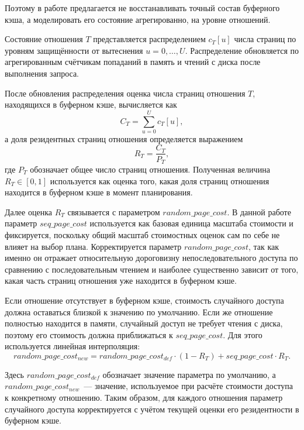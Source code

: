 Поэтому в работе предлагается не восстанавливать точный состав буферного кэша, а моделировать его состояние агрегированно, на уровне отношений. 

Состояние отношения \(T\) представляется распределением \(c_T[u]\) числа страниц по уровням защищённости от вытеснения \(u=0,\ldots,U\). Распределение обновляется по агрегированным счётчикам попаданий в память и чтений с диска после выполнения запроса.

После обновления распределения оценка числа страниц отношения \(T\), находящихся в буферном кэше, вычисляется как
\[
C_T=\sum_{u=0}^{U}c_T[u],
\]
а доля резидентных страниц отношения определяется выражением
\[
R_T=\frac{C_T}{P_T},
\]
где \(P_T\) обозначает общее число страниц отношения. Полученная величина \(R_T\in[0,1]\) используется как оценка того, какая доля страниц отношения находится в буферном кэше в момент планирования.

Далее оценка \(R_T\) связывается с параметром \(random\_page\_cost\). В данной работе параметр \(seq\_page\_cost\) используется как базовая единица масштаба стоимости и фиксируется, поскольку общий масштаб стоимостных оценок сам по себе не влияет на выбор плана. Корректируется параметр \(random\_page\_cost\), так как именно он отражает относительную дороговизну непоследовательного доступа по сравнению с последовательным чтением и наиболее существенно зависит от того, какая часть страниц отношения уже находится в буферном кэше.

Если отношение отсутствует в буферном кэше, стоимость случайного доступа должна оставаться близкой к значению по умолчанию. Если же отношение полностью находится в памяти, случайный доступ не требует чтения с диска, поэтому его стоимость должна приближаться к \(seq\_page\_cost\). Для этого используется линейная интерполяция:
\begin{equation}
random\_page\_cost_{new} =
random\_page\_cost_{def} \cdot (1 - R_T) + seq\_page\_cost \cdot R_T.
\label{eq:rpc_calibration}
\end{equation}

Здесь \(random\_page\_cost_{def}\) обозначает значение параметра по умолчанию, а \(random\_page\_cost_{new}\)~--- значение, используемое при расчёте стоимости доступа к конкретному отношению. Таким образом, для каждого отношения параметр случайного доступа корректируется с учётом текущей оценки его резидентности в буферном кэше.


